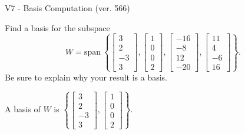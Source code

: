 \begin{exercise}
  \begin{exerciseTitle}V7 - Basis Computation (ver. 566)\end{exerciseTitle}
  \begin{exerciseStatement}
    Find a basis for the subspace 
\[W=\mathrm{span}\ \left\{\left[\begin{array}{r}
3 \\
2 \\
-3 \\
3
\end{array}\right] , \left[\begin{array}{r}
1 \\
0 \\
0 \\
2
\end{array}\right] , \left[\begin{array}{r}
-16 \\
-8 \\
12 \\
-20
\end{array}\right] , \left[\begin{array}{r}
11 \\
4 \\
-6 \\
16
\end{array}\right]\right\}.\]
 Be sure to explain why your result is a basis.


  \end{exerciseStatement}
  \begin{exerciseAnswer}
   A basis of \(W\) is  \(\left\{\left[\begin{array}{r}
3 \\
2 \\
-3 \\
3
\end{array}\right] , \left[\begin{array}{r}
1 \\
0 \\
0 \\
2
\end{array}\right]\right\}\).
  


  \end{exerciseAnswer}
\end{exercise}